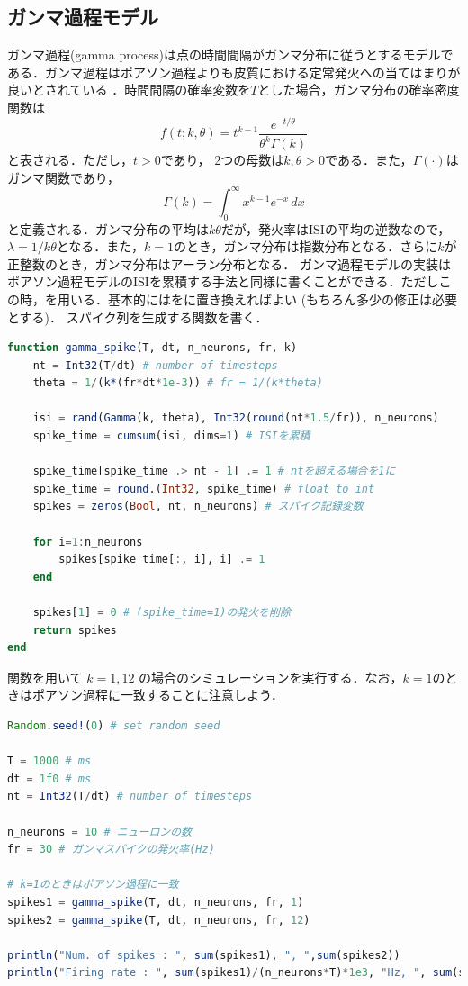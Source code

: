 \subsection{ガンマ過程モデル}
ガンマ過程(gamma process)は点の時間間隔がガンマ分布に従うとするモデルである．ガンマ過程はポアソン過程よりも皮質における定常発火への当てはまりが良いとされている \citep{Shinomoto2003-lz,Maimon2009-mb}．時間間隔の確率変数を$T$とした場合，ガンマ分布の確率密度関数は
\begin{equation}
f(t;k,\theta) =  t^{k-1}\frac{e^{-t/\theta}}{\theta^k\Gamma(k)}
\end{equation}
と表される．ただし，$t > 0$であり， 2つの母数は$k, \theta > 0$である．また，$\Gamma (\cdot)$はガンマ関数であり，
\begin{equation}
\Gamma (k)=\int _{0}^{\infty }x^{k-1}e^{-x}\,dx
\end{equation}
と定義される．ガンマ分布の平均は$k\theta$だが，発火率はISIの平均の逆数なので，$\lambda=1/k\theta$となる．また，$k=1$のとき，ガンマ分布は指数分布となる．さらに$k$が正整数のとき，ガンマ分布はアーラン分布となる．
ガンマ過程モデルの実装はポアソン過程モデルのISIを累積する手法と同様に書くことができる．ただしこの時，を用いる．基本的にはをに置き換えればよい (もちろん多少の修正は必要とする)．
スパイク列を生成する関数を書く．
\begin{lstlisting}[language=julia]
function gamma_spike(T, dt, n_neurons, fr, k)
    nt = Int32(T/dt) # number of timesteps
    theta = 1/(k*(fr*dt*1e-3)) # fr = 1/(k*theta)

    isi = rand(Gamma(k, theta), Int32(round(nt*1.5/fr)), n_neurons)
    spike_time = cumsum(isi, dims=1) # ISIを累積

    spike_time[spike_time .> nt - 1] .= 1 # ntを超える場合を1に
    spike_time = round.(Int32, spike_time) # float to int
    spikes = zeros(Bool, nt, n_neurons) # スパイク記録変数

    for i=1:n_neurons    
        spikes[spike_time[:, i], i] .= 1
    end

    spikes[1] = 0 # (spike_time=1)の発火を削除
    return spikes
end
\end{lstlisting}
 関数を用いて $k=1, 12$ の場合のシミュレーションを実行する．なお，$k=1$のときはポアソン過程に一致することに注意しよう．
\begin{lstlisting}[language=julia]
Random.seed!(0) # set random seed

T = 1000 # ms
dt = 1f0 # ms
nt = Int32(T/dt) # number of timesteps

n_neurons = 10 # ニューロンの数
fr = 30 # ガンマスパイクの発火率(Hz)

# k=1のときはポアソン過程に一致
spikes1 = gamma_spike(T, dt, n_neurons, fr, 1)
spikes2 = gamma_spike(T, dt, n_neurons, fr, 12)

println("Num. of spikes : ", sum(spikes1), ", ",sum(spikes2))
println("Firing rate : ", sum(spikes1)/(n_neurons*T)*1e3, "Hz, ", sum(spikes2)/(n_neurons*T)*1e3, "Hz")
\end{lstlisting}
